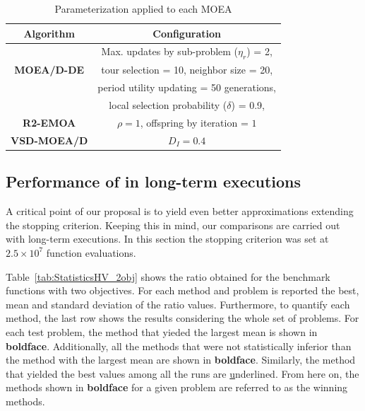 \begin{table}[t]
\centering
\caption{ Parameterization applied to each MOEA}
\label{tab:Parametrization}
\begin{tabular}{c|c}
\hline
\textbf{Algorithm} & \textbf{Configuration} \\ \hline
\multirow{3}{*}{
\textbf{MOEA/D-DE}} & Max. updates by sub-problem ($\eta_r$) = 2, \\
 & tour selection = 10,   neighbor size = 20, \\
 & period utility updating = 50 generations, \\
 & local selection probability ($\delta$) = 0.9,\\ \hline
\textbf{R2-EMOA} & $\rho=1$, offspring by iteration = $1$ \\ \hline
\textbf{VSD-MOEA/D} & $D_I=0.4$ \\ \hline
\end{tabular}
\end{table}



\subsection{Performance of \MOEAS{} in long-term executions}


A critical point of our proposal is to yield even better approximations extending the stopping criterion.
%
Keeping this in mind, our comparisons are carried out with long-term executions.
%
In this section the stopping criterion was set at $2.5 \times 10^7$ function evaluations.
%

%
Table~\ref{tab:StatisticsHV_2obj} shows the \HV{} ratio obtained for the benchmark functions with two objectives.
%
For each method and problem is reported the best, mean and standard deviation of the \HV{} ratio values.
%
Furthermore, to quantify each method, the last row shows the results considering the whole set of problems.
%
For each test problem, the method that yieded the largest mean is shown in \textbf{boldface}.
%
Additionally, all the methods that were not statistically inferior than the method with the largest mean are shown in \textbf{boldface}.
%
Similarly, the method that yielded the best \HV{} values among all the runs are {\ul underlined}.
%
From here on, the methods shown in {\bf boldface} for a given problem are referred to as the winning methods.
%

